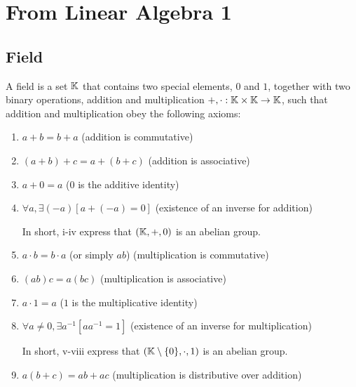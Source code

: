 
\section{From Linear Algebra 1}

\subsection{Field}
\begin{definition}[Field]
    A field is a set $\mathbb{K}$ that contains two special elements, $0$ and $1$, together with two binary operations, addition and
    multiplication $+, \cdot: \mathbb{K} \times \mathbb{K} \to \mathbb{K}$, such that addition and multiplication obey the following axioms:
    \begin{enumerate}
        \item $a+b=b+a$ \hfill (addition is commutative)
        \item $(a+b)+c=a+(b+c)$ \hfill (addition is associative)
        \item $a+0=a$ \hfill ($0$ is the additive identity)
        \item $\forall a, \exists (-a) [a+(-a)=0]$ \hfill (existence of an inverse for addition)

            In short, i-iv express that $(\mathbb{K}, +, 0)$ is an abelian group.
        \item $a\cdot b=b\cdot a$ (or simply $ab$) \hfill (multiplication is commutative)
        \item $(ab)c=a(bc)$ \hfill (multiplication is associative) 
        \item $a\cdot 1=a$ \hfill ($1$ is the multiplicative identity)
        \item $\forall a \neq 0, \exists a^{-1} [aa^{-1}=1]$ \hfill (existence of an inverse for multiplication)

            In short, v-viii express that $(\mathbb{K} \setminus \{0\}, \cdot, 1)$ is an abelian group.

        \item $a(b+c)=ab+ac$ \hfill (multiplication is distributive over addition)
    \end{enumerate}
\end{definition}

